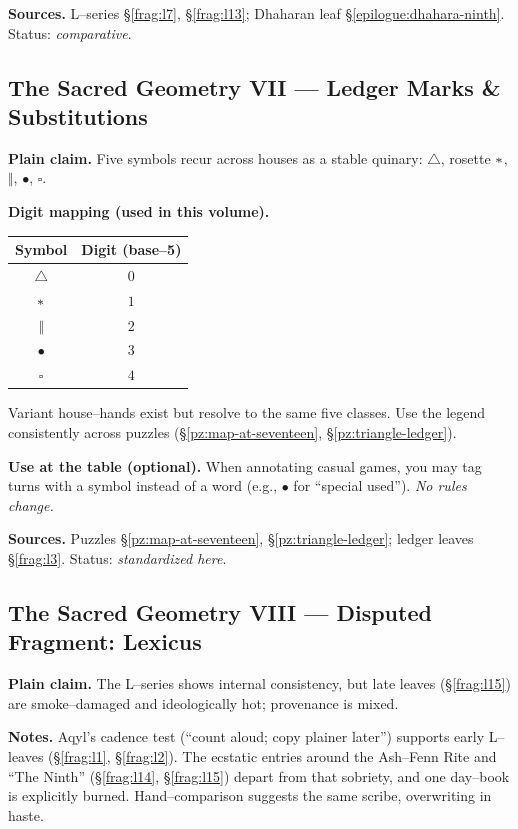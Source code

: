 \documentclass[11pt]{article}
\numberwithin{equation}{section} %
\theoremstyle{plain} %
\theoremstyle{definition} %
\theoremstyle{remark} %
\begin{document}
\medskip
\noindent\textbf{Sources.} L–series \S\ref{frag:l7}, \S\ref{frag:l13}; Dhaharan leaf \S\ref{epilogue:dhahara-ninth}. Status: \emph{comparative}.

\subsection{The Sacred Geometry VII — Ledger Marks \& Substitutions}
\label{geometry:ledger-marks}

\noindent\textbf{Plain claim.} Five symbols recur across houses as a stable quinary: \(\triangle\), rosette \(\large\ast\), \(\Vert\), \(\bullet\), \(\square\).

\medskip
\noindent\textbf{Digit mapping (used in this volume).}
\begin{center}
\begin{tabular}{c|c}
\textbf{Symbol} & \textbf{Digit (base–5)} \\
\hline
\(\triangle\) & \(0\) \\
\(\large\ast\) & \(1\) \\
\(\Vert\) & \(2\) \\
\(\bullet\) & \(3\) \\
\(\square\) & \(4\) \\
\end{tabular}
\end{center}
Variant house–hands exist but resolve to the same five classes. Use the legend consistently across puzzles (\S\ref{pz:map-at-seventeen}, \S\ref{pz:triangle-ledger}).

\medskip
\noindent\textbf{Use at the table (optional).} When annotating casual games, you may tag turns with a symbol instead of a word (e.g., \(\bullet\) for “special used”). \emph{No rules change.}

\medskip
\noindent\textbf{Sources.} Puzzles \S\ref{pz:map-at-seventeen}, \S\ref{pz:triangle-ledger}; ledger leaves \S\ref{frag:l3}. Status: \emph{standardized here}.

\subsection{The Sacred Geometry VIII — Disputed Fragment: Lexicus}
\label{geometry:lexicus-disputed}

\noindent\textbf{Plain claim.} The L–series shows internal consistency, but late leaves (\S\ref{frag:l15}) are smoke–damaged and ideologically hot; provenance is mixed.

\medskip
\noindent\textbf{Notes.} Aqyl’s cadence test (“count aloud; copy plainer later”) supports early L–leaves (\S\ref{frag:l1}, \S\ref{frag:l2}). The ecstatic entries around the Ash–Fenn Rite and “The Ninth” (\S\ref{frag:l14}, \S\ref{frag:l15}) depart from that sobriety, and one day–book is explicitly burned. Hand–comparison suggests the same scribe, overwriting in haste.
\end{document}
